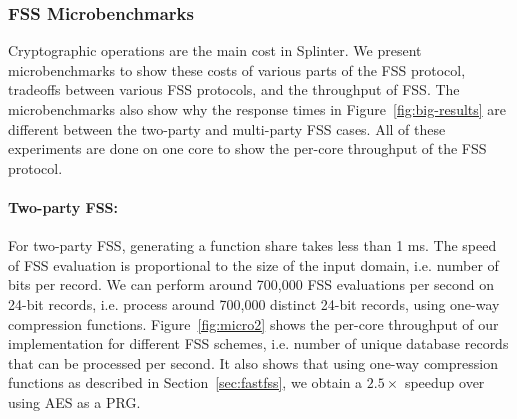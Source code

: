 


\subsubsection{FSS Microbenchmarks}
\label{sec:micro}
Cryptographic operations are the main
cost in Splinter.
We present microbenchmarks to show these costs of various
parts of the FSS protocol, 
tradeoffs between various FSS protocols,
and the throughput of FSS. The microbenchmarks
also show why the response times in Figure~\ref{fig:big-results} 
are different between the two-party and multi-party FSS cases.
All of these experiments are done on one core to show the 
per-core throughput of the FSS protocol.

\paragraph{Two-party FSS:}
For two-party FSS, generating a function share takes less than 1 ms.
The speed of FSS evaluation is proportional to the size of the input domain, i.e. number of bits per record. 
We can perform around 700,000 FSS evaluations per second on
24-bit records, i.e. process around 700,000
distinct 24-bit records, using one-way compression functions.
Figure~\ref{fig:micro2} shows the per-core throughput of our implementation
for different FSS schemes, i.e. number of unique database records that can be processed
per second. It also shows that using one-way compression functions
as described in Section~\ref{sec:fastfss}, we obtain a $2.5\times$ speedup over using 
AES as a PRG.

